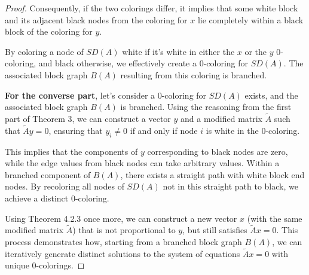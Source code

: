 \begin{proof}
	Consequently, if the two colorings differ, it implies that some white block and its adjacent black nodes from the coloring for $x$ lie completely within a black block of the coloring for $y$. 
	
	By coloring a node of $SD(A)$ white if it's white in either the $x$ or the $y$ 0-coloring, and black otherwise, we effectively create a 0-coloring for $SD(A)$. The associated block graph $B(A)$ resulting from this coloring is branched.


	\textbf{For the converse part}, let's consider a 0-coloring for $SD(A)$ exists, and the associated block graph $B(A)$ is branched. Using the reasoning from the first part of Theorem 3, we can construct a vector $y$ and a modified matrix $\tilde{A}$ such that $\tilde{A}y = 0$, ensuring that $y_i \neq 0$ if and only if node $i$ is white in the 0-coloring.
	
	This implies that the components of $y$ corresponding to black nodes are zero, while the edge values from black nodes can take arbitrary values. Within a branched component of $B(A)$, there exists a straight path with white block end nodes. By recoloring all nodes of $SD(A)$ not in this straight path to black, we achieve a distinct 0-coloring.
	
	Using Theorem 4.2.3 once more, we can construct a new vector $x$ (with the same modified matrix $\tilde{A}$) that is not proportional to $y$, but still satisfies $\tilde{A}x = 0$. This process demonstrates how, starting from a branched block graph $B(A)$, we can iteratively generate distinct solutions to the system of equations $\tilde{A}x = 0$ with unique 0-colorings.

\end{proof}